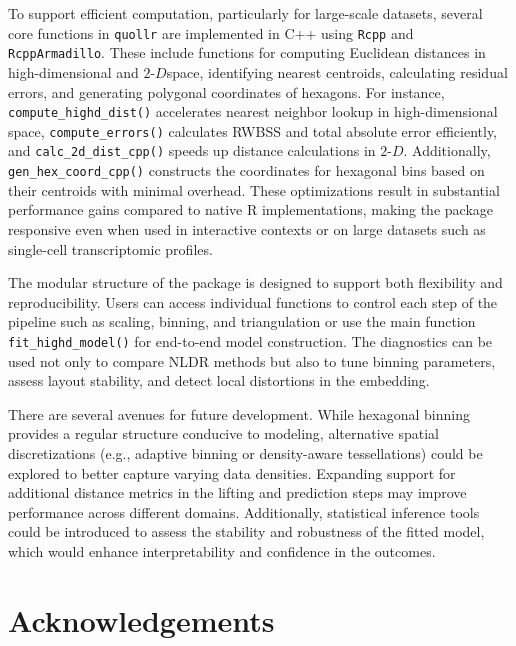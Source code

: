 \documentclass[
  11pt,
  a4paper,
]{report}
\newcommand{\twoD}{$2\text{-}D$}
\begin{document}
To support efficient computation, particularly for large-scale datasets,
several core functions in \texttt{quollr} are implemented in C++ using
\texttt{Rcpp} and \texttt{RcppArmadillo}. These include functions for
computing Euclidean distances in high-dimensional and \twoD space,
identifying nearest centroids, calculating residual errors, and
generating polygonal coordinates of hexagons. For instance,
\texttt{compute\_highd\_dist()} accelerates nearest neighbor lookup in
high-dimensional space, \texttt{compute\_errors()} calculates RWBSS and
total absolute error efficiently, and \texttt{calc\_2d\_dist\_cpp()}
speeds up distance calculations in \twoD. Additionally,
\texttt{gen\_hex\_coord\_cpp()} constructs the coordinates for hexagonal
bins based on their centroids with minimal overhead. These optimizations
result in substantial performance gains compared to native R
implementations, making the package responsive even when used in
interactive contexts or on large datasets such as single-cell
transcriptomic profiles.

The modular structure of the package is designed to support both
flexibility and reproducibility. Users can access individual functions
to control each step of the pipeline such as scaling, binning, and
triangulation or use the main function \texttt{fit\_highd\_model()} for
end-to-end model construction. The diagnostics can be used not only to
compare NLDR methods but also to tune binning parameters, assess layout
stability, and detect local distortions in the embedding.

There are several avenues for future development. While hexagonal
binning provides a regular structure conducive to modeling, alternative
spatial discretizations (e.g., adaptive binning or density-aware
tessellations) could be explored to better capture varying data
densities. Expanding support for additional distance metrics in the
lifting and prediction steps may improve performance across different
domains. Additionally, statistical inference tools could be introduced
to assess the stability and robustness of the fitted model, which would
enhance interpretability and confidence in the outcomes.

\section{Acknowledgements}\label{acknowledgements-1}
\end{document}
